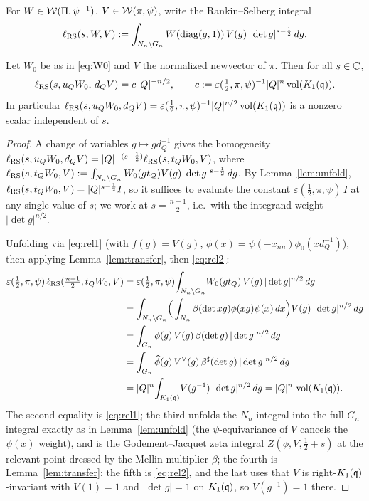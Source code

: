 For $W\in\mathcal{W}(\Pi,\psi^{-1})$, $V\in\mathcal{W}(\pi,\psi)$, write the Rankin--Selberg
integral
\[
\ell_{\mathrm{RS}}(s,W,V):=\int_{N_n\backslash G_n}W(\operatorname{diag}(g,1))\,V(g)\,|\det g|^{s-\frac12}\,dg.
\]

\begin{qtwoproposition}\label{prop:final}
Let $W_0$ be as in \eqref{eq:W0} and $V$ the normalized newvector of $\pi$. Then
for all $s\in\mathbb{C}$,
\[
\ell_{\mathrm{RS}}(s,u_Q W_0,\,d_Q V)=c\,|Q|^{-n/2},\qquad
c:=\varepsilon(\tfrac12,\pi,\psi)^{-1}|Q|^n\operatorname{vol}(K_1(\mathfrak{q})) .
\]
In particular $\ell_{\mathrm{RS}}(s,u_Q W_0,d_Q V)=\varepsilon(\tfrac12,\pi,\psi)^{-1}|Q|^{n/2}\operatorname{vol}(K_1(\mathfrak{q}))$
is a nonzero scalar independent of $s$.
\end{qtwoproposition}

\begin{proof}
A change of variables $g\mapsto g d_Q^{-1}$ gives the homogeneity
$\ell_{\mathrm{RS}}(s,u_Q W_0,d_Q V)=|Q|^{-(s-\frac12)}\ell_{\mathrm{RS}}(s,t_Q W_0,V)$, where
$\ell_{\mathrm{RS}}(s,t_Q W_0,V):=\int_{N_n\backslash G_n}W_0(g t_Q)V(g)|\det g|^{s-\frac12}\,dg$.
By Lemma~\ref{lem:unfold}, $\ell_{\mathrm{RS}}(s,t_Q W_0,V)=|Q|^{s-\frac12}I$, so it suffices to
evaluate the constant $\varepsilon(\tfrac12,\pi,\psi)\,I$ at any single value of $s$; we work
at $s=\tfrac{n+1}{2}$, i.e.\ with the integrand weight $|\det g|^{n/2}$.

Unfolding via \eqref{eq:rel1} (with $f(g)=V(g)$, $\phi(x)=\psi(-x_{nn})\phi_0(x d_Q^{-1})$),
then applying Lemma~\ref{lem:transfer}, then \eqref{eq:rel2}:
\begin{align*}
\varepsilon(\tfrac12,\pi,\psi)\,\ell_{\mathrm{RS}}(\tfrac{n+1}{2},t_Q W_0,V)
&=\varepsilon(\tfrac12,\pi,\psi)\!\int_{N_n\backslash G_n}\!W_0(g t_Q)\,V(g)\,|\det g|^{n/2}\,dg\\
&=\int_{N_n\backslash G_n}\!\Big(\int_{N_n}\beta(\det xg)\phi(xg)\psi(x)\,dx\Big)V(g)\,|\det g|^{n/2}\,dg\\
&=\int_{G_n}\phi(g)\,V(g)\,\beta(\det g)\,|\det g|^{n/2}\,dg\\
&=\int_{G_n}\widehat\phi(g)\,V^\vee(g)\,\beta^\sharp(\det g)\,|\det g|^{n/2}\,dg\\
&=|Q|^n\!\int_{K_1(\mathfrak{q})}\!V(g^{-1})\,|\det g|^{n/2}\,dg
=|Q|^n\,\operatorname{vol}(K_1(\mathfrak{q})).
\end{align*}
The second equality is \eqref{eq:rel1}; the third unfolds the $N_n$-integral into the full
$G_n$-integral exactly as in Lemma~\ref{lem:unfold} (the $\psi$-equivariance of $V$ cancels the
$\psi(x)$ weight), and is the Godement--Jacquet zeta integral $Z(\phi,V,\tfrac12+s)$ at the relevant
point dressed by the Mellin multiplier $\beta$; the fourth is Lemma~\ref{lem:transfer}; the fifth is
\eqref{eq:rel2}, and the last uses that $V$ is right-$K_1(\mathfrak{q})$-invariant with $V(1)=1$ and
$|\det g|=1$ on $K_1(\mathfrak{q})$, so $V(g^{-1})=1$ there.


\end{proof}
